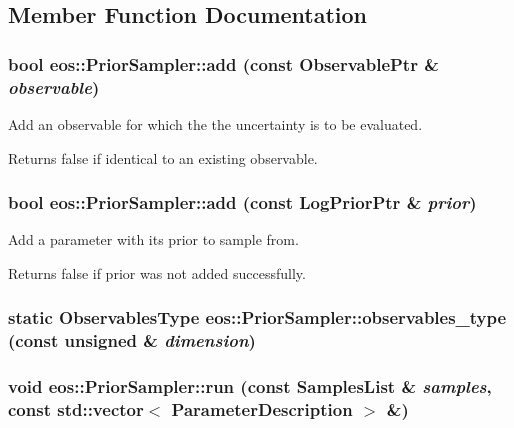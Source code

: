 \subsection{Member Function Documentation}
\hypertarget{classeos_1_1PriorSampler_ad402bbf857e13b0ce3c6af174e8c72dd}{
\subsubsection[{add}]{\setlength{\rightskip}{0pt plus 5cm}bool eos::PriorSampler::add (const {\bf ObservablePtr} \& {\em observable})}}
\label{classeos_1_1PriorSampler_ad402bbf857e13b0ce3c6af174e8c72dd}
Add an observable for which the the uncertainty is to be evaluated. \begin{DoxyReturn}{Returns}
false if identical to an existing observable. 
\end{DoxyReturn}
\hypertarget{classeos_1_1PriorSampler_aedf28860d2238779355f6fd583555851}{
\subsubsection[{add}]{\setlength{\rightskip}{0pt plus 5cm}bool eos::PriorSampler::add (const {\bf LogPriorPtr} \& {\em prior})}}
\label{classeos_1_1PriorSampler_aedf28860d2238779355f6fd583555851}
Add a parameter with its prior to sample from. \begin{DoxyReturn}{Returns}
false if prior was not added successfully. 
\end{DoxyReturn}
\hypertarget{classeos_1_1PriorSampler_a999109fc4dcf705444089aff091dc620}{
\subsubsection[{observables\_\-type}]{\setlength{\rightskip}{0pt plus 5cm}static {\bf ObservablesType} eos::PriorSampler::observables\_\-type (const unsigned \& {\em dimension})}}
\label{classeos_1_1PriorSampler_a999109fc4dcf705444089aff091dc620}
\hypertarget{classeos_1_1PriorSampler_a610cb408ecf74f29d8632c3b5b264c91}{
\subsubsection[{run}]{\setlength{\rightskip}{0pt plus 5cm}void eos::PriorSampler::run (const {\bf SamplesList} \& {\em samples}, \/  const std::vector$<$ {\bf ParameterDescription} $>$ \&)}}
